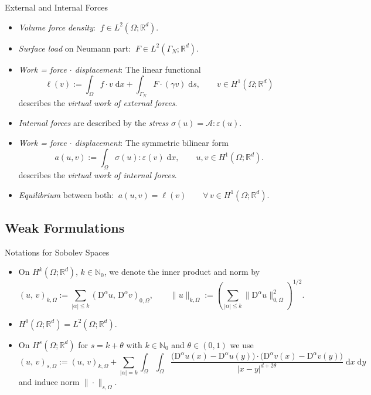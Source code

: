 \documentclass[10pt,aspectratio=169]{beamer}
\def\N{{\mathbb N}}
\def\R{{\mathbb R}}
\def\cA{{\mathcal A}}
\def\d{{\mathrm{d}}}
\def\dx{{\d x}}
\def\ds{{\d s}}
\def\dy{{\d y}}
\def\Diff{{\mathrm{D}}}
\begin{document}
\begin{frame}{External and Internal Forces}
	\begin{itemize}
		\item {\em Volume force density}: $\ f\in L^2(\Omega;\R^d)$.
		\item {\em Surface load} on Neumann part: $\ F\in L^2(\Gamma_N;\R^d)$.
		\item {\em Work = force $\cdot$ displacement}: The linear functional
		      \begin{equation*}
			      \ell(v)
			      :=
			      \int_\Omega f\cdot v\;\dx
			      +
			      \int_{\Gamma_N} F\cdot (\gamma v)\;\ds,\qquad v\in H^1(\Omega;\R^d)
		      \end{equation*}
		      describes the {\em virtual work of external forces}.
		\item {\em Internal forces} are described by the {\em stress} $\sigma(u) = \cA:\varepsilon(u)$.
		\item {\em Work = force $\cdot$ displacement}: The symmetric bilinear form
		      \begin{equation*}
			      a(u,v)
			      :=
			      \int_\Omega \sigma(u):\varepsilon(v)\;\dx,\qquad u,v\in H^1(\Omega;\R^d).
		      \end{equation*}
		      describes the {\em virtual work of internal forces}.
		\item {\em Equilibrium} between both: $\ a(u,v) = \ell(v)\qquad\forall\,v\in H^1(\Omega;\R^d)$.
	\end{itemize}
\end{frame}

\subsection{Weak Formulations}

\begin{frame}{Notations for Sobolev Spaces}
	\begin{itemize}
		\item On $H^k(\Omega;\R^d),\, k\in \N_0$, we denote the inner product and norm by
		      \begin{equation*}
			      (u,\, v)_{k,\Omega}:= \sum_{|\alpha|\le k}(\Diff^\alpha u,\, \Diff^\alpha v)_{0,\Omega},\qquad \|u\|_{k,\Omega}
			      :=
			      \left(
			      \sum_{|\alpha|\le k}\|\Diff^\alpha u\|_{0,\Omega}^2
			      \right)^{1/2}.
		      \end{equation*}
		\item $H^0(\Omega;\R^d) = L^2(\Omega;\R^d)$.
		\item On $H^s(\Omega;\R^d)$ for $s= k+\theta$ with $k\in \N_0$ and $\theta\in(0,1)$ we use
		      \begin{equation*}
			      (u,\,v)_{s,\Omega}
			      :=
			      (u,\,v)_{k,\Omega}
			      +
			      \sum_{|\alpha|=k}
			      \int_\Omega\int_\Omega
			      \frac{\big(\Diff^\alpha u(x)-\Diff^\alpha u(y)\big)\cdot\big(\Diff^\alpha v(x)-\Diff^\alpha v(y)\big)}
			      {|x-y|^{d+2\theta}}\;\dx\;\dy
		      \end{equation*}
		      and induce norm $\|\cdot\|_{s,\Omega}$.
	\end{itemize}
\end{frame}
\end{document}
